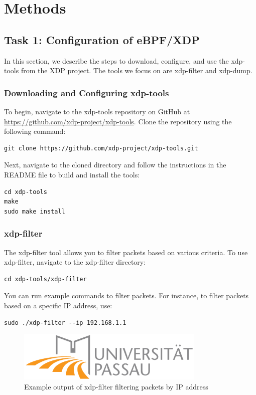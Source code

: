 \chapter{Methods}\label{chap:methods}
\section{Task 1: Configuration of eBPF/XDP }
In this section, we describe the steps to download, configure, and use the xdp-tools from the XDP project. The tools we focus on are xdp-filter and xdp-dump.

\subsection{Downloading and Configuring xdp-tools}
To begin, navigate to the xdp-tools repository on GitHub at \url{https://github.com/xdp-project/xdp-tools}. Clone the repository using the following command:
\begin{verbatim}
git clone https://github.com/xdp-project/xdp-tools.git
\end{verbatim}

Next, navigate to the cloned directory and follow the instructions in the README file to build and install the tools:
\begin{verbatim}
cd xdp-tools
make
sudo make install
\end{verbatim}

\subsection{xdp-filter}
The xdp-filter tool allows you to filter packets based on various criteria. To use xdp-filter, navigate to the xdp-filter directory:
\begin{verbatim}
cd xdp-tools/xdp-filter
\end{verbatim}

You can run example commands to filter packets. For instance, to filter packets based on a specific IP address, use:
\begin{verbatim}
sudo ./xdp-filter --ip 192.168.1.1
\end{verbatim}

\begin{figure}[h]
\centering
\includegraphics[width=0.8\textwidth]{../images/uni-logo.png}
\caption{Example output of xdp-filter filtering packets by IP address}
\label{fig:xdp-filter-example}
\end{figure}

